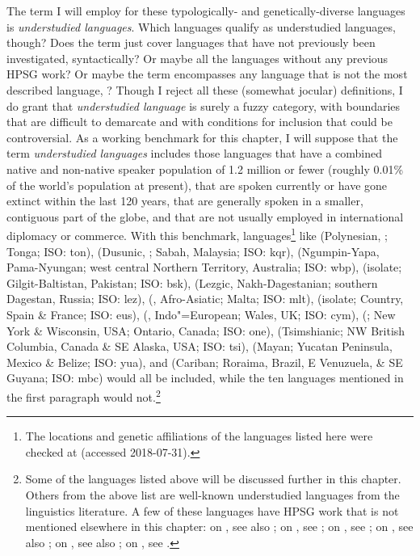 \documentclass[output=paper
	        ,collection
	        ,collectionchapter
 	        ,biblatex
                ,babelshorthands
                ,newtxmath
                ,draftmode
                ,colorlinks, citecolor=brown
]{langscibook}
\begin{document}
The term I will employ for these typologically- and genetically-diverse languages is \emph{understudied languages}. Which languages qualify as understudied languages, though? Does the term just cover languages that have not previously been investigated, syntactically? Or maybe all the languages without any previous HPSG work? Or maybe the term encompasses any language that is not the most described language, ? Though I reject all these (somewhat jocular) definitions, I do grant that \textit{understudied language} is surely a fuzzy category, with boundaries that are difficult to demarcate and with conditions for inclusion that could be controversial. As a working benchmark for this chapter, I will suppose that the term \textit{understudied languages} includes those languages that have a combined native and non-native speaker population of 1.2 million or fewer (roughly 0.01\% of the world's population at present), that are spoken currently or have gone extinct within the last 120 years, that are generally spoken in a smaller, contiguous part of the globe, and that are not usually employed in international diplomacy or commerce. With this benchmark, languages\footnote{The locations and genetic affiliations of the languages listed here were checked at \citet{glottolog18} (accessed 2018-07-31).} like
 (Polynesian, ; Tonga; ISO: ton), 
 (Dusunic, ; Sabah, Malaysia; ISO: kqr),
 (Ngumpin-Yapa, Pama-Nyungan; west central Northern Territory, Australia; ISO: wbp), 
 (isolate; Gilgit-Baltistan, Pakistan; ISO: bsk), 
 (Lezgic, Nakh-Dagestanian; southern Dagestan, Russia; ISO: lez), 
 (, Afro-Asiatic; Malta; ISO: mlt), 
 (isolate;  Country, Spain \& France; ISO: eus),  
 (, Indo"=European; Wales, UK; ISO: cym), 
 (; New York \& Wisconsin, USA; Ontario, Canada; ISO: one), 
 (Tsimshianic; NW British Columbia, Canada \& SE Alaska, USA; ISO: tsi),
 (Mayan; Yucatan Peninsula, Mexico \& Belize; ISO: yua), and
 (Cariban; Roraima, Brazil, E Venuzuela, \& SE Guyana; ISO: mbc)
would all be included, while the ten languages mentioned in the first paragraph would not.\footnote{\label{list expln}Some of the languages listed above will be discussed further in this chapter. Others from the above list are well-known understudied languages from the linguistics literature. A few of these languages have HPSG work that is not mentioned elsewhere in this chapter: on , see also \citet{dukes2000}; on , see \citet{donosag99}; on , see \citet{MuellerMalteseSketch}; on , see also \citet{CB11}; on , see also \citet{KM2010a-u}; on , see \citet{dabkowski17}.}   
\end{document}
